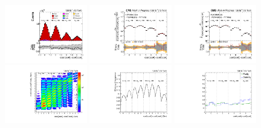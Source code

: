 \begin{refsection}
\clearpage
\begin{figure}[htb]
\begin{center}
 \includegraphics[width=0.32\textwidth]{fig_fullRun2UL/controlplots/combined/Hyp_LLBarCPrk_vs_TTBarMass.pdf}
 \includegraphics[width=0.32\textwidth]{fig_fullRun2UL/unfolding/combined/UnfoldedResults_c_Prk_mttbar.pdf}
 \includegraphics[width=0.32\textwidth]{fig_fullRun2UL/unfolding/combined/UnfoldedResultsNorm_c_Prk_mttbar.pdf} \\
 \includegraphics[width=0.32\textwidth]{fig_fullRun2UL/unfolding/combined/ResponseMatrix_c_Prk_mttbar.pdf}
 \includegraphics[width=0.32\textwidth]{fig_fullRun2UL/unfolding/combined/TotEff_c_Prk_mttbar.pdf}
 \includegraphics[width=0.32\textwidth]{fig_fullRun2UL/unfolding/combined/PurStab_c_Prk_mttbar.pdf} \\

\end{center}
\end{figure}
\end{refsection}
